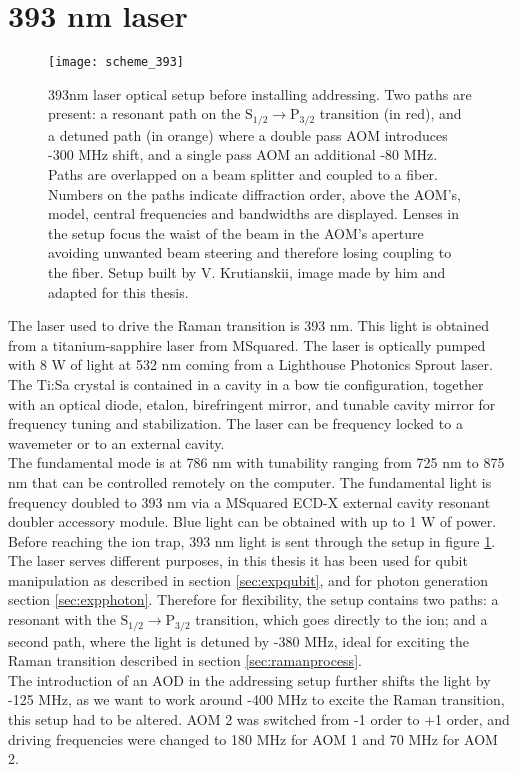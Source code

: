 \section{393 nm laser}
\begin{figure}[!ht]
\centering
\texttt{[image: scheme\_393]}
\caption{393nm laser optical setup before installing addressing. Two paths are present: a resonant path on the $\text{S}_{1/2} \to \text{P}_{3/2}$ transition (in red), and a detuned path (in orange) where a double pass AOM introduces -300 MHz shift, and a single pass AOM an additional -80 MHz. Paths are overlapped on a beam splitter and coupled to a fiber. Numbers on the paths indicate diffraction order, above the AOM's, model, central frequencies and bandwidths are displayed. Lenses in the setup focus the waist of the beam in the AOM's aperture avoiding unwanted beam steering and therefore losing coupling to the fiber. Setup built by V. Krutianskii, image made by him and adapted for this thesis.
}
\label{scheme393}
\end{figure}
The laser used to drive the Raman transition is 393 nm. This light is obtained from a titanium-sapphire laser from MSquared. The laser is optically pumped with 8 W of light at 532 nm coming from a Lighthouse Photonics Sprout laser. The Ti:Sa crystal is contained in a cavity in a bow tie configuration, together with an optical diode, etalon, birefringent mirror, and tunable cavity mirror for frequency tuning and stabilization. The laser can be frequency locked to a wavemeter or to an external cavity.\\ The fundamental mode is at 786 nm with tunability ranging from 725 nm to 875 nm that can be controlled remotely on the computer. The fundamental light is frequency doubled to 393 nm via a MSquared ECD-X external cavity resonant doubler accessory module. Blue light can be obtained with up to 1 W of power. Before reaching the ion trap, 393 nm light is sent through the setup in figure \ref{scheme393}. The laser serves different purposes, in this thesis it has been used for qubit manipulation as described in section \ref{sec:expqubit}, and for photon generation section \ref{sec:expphoton}. Therefore for flexibility, the setup contains two paths: a resonant with the $\text{S}_{1/2} \to \text{P}_{3/2}$ transition, which goes directly to the ion; and a second path, where the light is detuned by -380 MHz, ideal for exciting the Raman transition described in section \ref{sec:ramanprocess}.\\
The introduction of an AOD in the addressing setup further shifts the light by -125 MHz, as we want to work around -400 MHz to excite the Raman transition,
this setup had to be altered. AOM 2 was switched from -1 order to +1 order, and driving frequencies were changed to 180 MHz for AOM 1 and 70 MHz for AOM 2.

